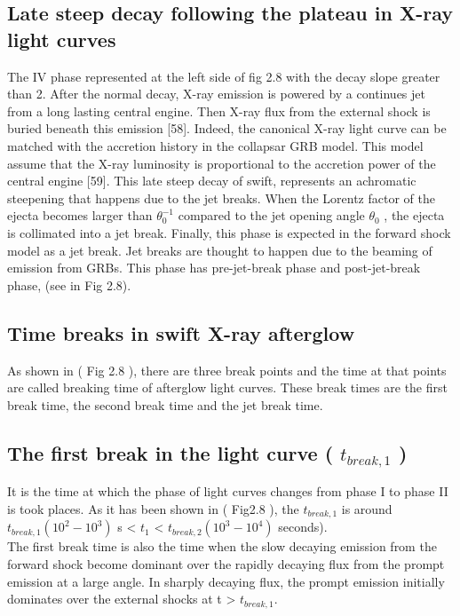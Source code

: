 \subsection{Late steep decay following the plateau in X-ray light curves}
 The  IV phase  represented at the left side of fig 2.8  with  the decay slope  greater than 2. After the normal decay, X-ray emission is powered by a continues jet from a long lasting central engine. Then X-ray flux from the external shock is buried beneath this emission [58]. Indeed, the canonical X-ray light curve can be matched with the accretion history in the collapsar GRB model. This model assume that the X-ray luminosity is proportional to the accretion power of the central engine [59].
This late steep decay of swift, represents an achromatic steepening that happens
due to the jet breaks. When the Lorentz factor of the ejecta becomes larger than
$ \theta_{0}^{-1} $ compared to the jet opening angle $ \theta_{0} $ , the ejecta is collimated into a jet break. Finally, this phase is expected in the forward shock model as a jet break. Jet breaks are thought to happen due to the beaming of  emission from GRBs. This phase has pre-jet-break phase and post-jet-break phase, (see in Fig 2.8).\citep{44} \citep{45}
\subsection{Time breaks in swift X-ray afterglow}
As shown in ( Fig 2.8 ), there are three break points and the time at that points are called breaking time of afterglow light curves. These break times are the first break time, the second break time and the jet break time.\\
\subsection{The first break in the light curve ( $ t_{break,1} $ )}
It  is  the time at which  the  phase  of light curves  changes from phase I to phase II is took places. As it has been shown  in ( Fig2.8 ), the $ t_{break,1} $ is around  $t_{break,1} (10^{2} - 10^{3} ) $ s  < $ t_{1} $ <  $ t_{break,2}( 10^{3} - 10^{4})$ seconds).\\
The first break time is also the time when the slow decaying emission from the
forward shock become dominant over the rapidly decaying flux from the prompt
emission at a large angle. In sharply decaying flux, the prompt emission initially
dominates over the external shocks at t > $ t_{break,1} $\citep{46}.
